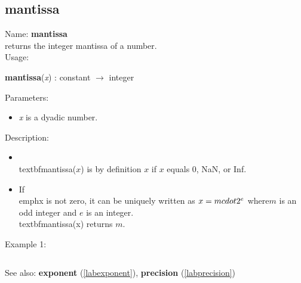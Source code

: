 \subsection{mantissa}
\label{labmantissa}
\noindent Name: \textbf{mantissa}\\
returns the integer mantissa of a number.\\
\noindent Usage: 
\begin{center}
\textbf{mantissa}(\emph{x}) : \textsf{constant} $\rightarrow$ \textsf{integer}\\
\end{center}
Parameters: 
\begin{itemize}
\item \emph{x} is a dyadic number.
\end{itemize}
\noindent Description: \begin{itemize}

\item \\textbf{mantissa}($x$) is by definition $x$ if $x$ equals 0, NaN, or Inf.\n
\item If \\emph{x} is not zero, it can be uniquely written as $x = m \\cdot 2^e$ where\n   $m$ is an odd integer and $e$ is an integer. \\textbf{mantissa}(x) returns $m$. \n\end{itemize}
\noindent Example 1: 
\begin{center}\begin{minipage}{15cm}\begin{Verbatim}[frame=single]
\end{Verbatim}
\end{minipage}\end{center}
See also: \textbf{exponent} (\ref{labexponent}), \textbf{precision} (\ref{labprecision})
